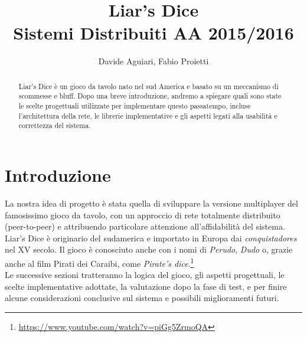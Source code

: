 \documentclass{llncs}
\begin{document}
	\mainmatter              %
	\title{Liar's Dice\\Sistemi Distribuiti AA 2015/2016}
	\author{Davide Aguiari, Fabio Proietti}
	\maketitle
	\begin{abstract}%
		Liar's Dice è un gioco da tavolo nato nel sud America e basato su un meccanismo di scommesse e bluff. Dopo una breve introduzione, andremo a spiegare quali sono state le scelte progettuali utilizzate per implementare questo passatempo, incluse l'architettura della rete, le librerie implementative e gli aspetti legati alla usabilità e correttezza del sistema.
		
	\end{abstract}

	\section{Introduzione}%
		La nostra idea di progetto è stata quella di sviluppare la versione multiplayer del  famosissimo gioco da tavolo, con un approccio di rete totalmente distribuito (peer-to-peer) e attribuendo particolare attenzione all'affidabilità del sistema. \\
		Liar's Dice \cite{wikiDice} è originario del sudamerica e importato in Europa dai \textit{conquistadores} nel XV secolo. Il gioco è conosciuto anche con i nomi di \textit{Perudo}, \textit{Dudo} o, grazie anche al film Pirati dei Caraibi, come \textit{Pirate's dice}.\footnote[1]{\url{https://www.youtube.com/watch?v=piGg5ZrmoQA}}\\
		Le successive sezioni tratteranno la logica del gioco, gli aspetti progettuali, le scelte implementative adottate, la valutazione dopo la fase di test, e per finire alcune considerazioni conclusive sul sistema e possibili miglioramenti futuri.
\end{document}
